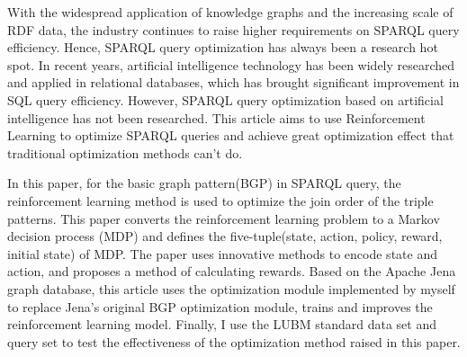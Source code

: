 \begin{eabstract}
    With the widespread application of knowledge graphs and the increasing scale of RDF data, the industry continues to raise higher requirements on SPARQL query efficiency. Hence, SPARQL query optimization has always been a research hot spot. In recent years, artificial intelligence technology has been widely researched and applied in relational databases, which has brought significant improvement in SQL query efficiency. However, SPARQL query optimization based on artificial intelligence has not been researched. This article aims to use Reinforcement Learning to optimize SPARQL queries and achieve great optimization effect that traditional optimization methods can't do. 
    
    In this paper, for the basic graph pattern(BGP) in SPARQL query, the reinforcement learning method is used to optimize the join order of the triple patterns. This paper converts the reinforcement learning problem to a Markov decision process (MDP) and defines the five-tuple(state, action, policy, reward, initial state) of MDP. The paper uses innovative methods to encode state and action, and proposes a method of calculating rewards. Based on the Apache Jena graph database, this article uses the optimization module implemented by myself to replace Jena's original BGP optimization module, trains and improves the reinforcement learning model. Finally, I use the LUBM standard data set and query set to test the effectiveness of the optimization method raised in this paper.
\end{eabstract}
